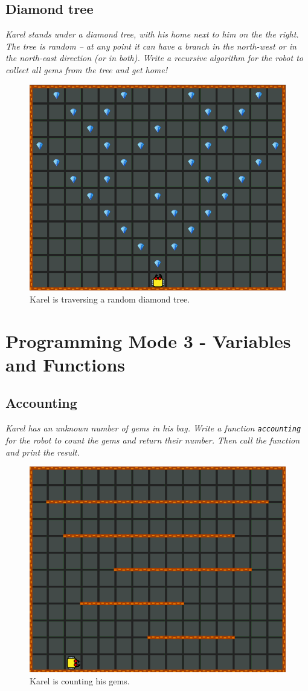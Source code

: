\subsection{Diamond tree}

{\em Karel stands under a diamond tree, with his home next to him on the the right. 
The tree is random -- at any point it can have 
a branch in the north-west or in the north-east direction (or in both). Write a recursive 
algorithm for the robot to collect all gems from the tree and get home!  }

\begin{figure}[!ht]
\begin{center}
\includegraphics[height=0.4\textwidth]{img/g04.png}
\end{center}
\vspace{-4mm}
\caption{Karel is traversing a random diamond tree.}
\label{fig:g04}
\vspace{-10mm}
\end{figure}


\section{Programming Mode 3 - Variables and Functions}

\subsection{Accounting}

{\em Karel has an unknown number of gems in his bag. Write a function {\tt accounting} for the 
robot to count the gems and return their number. Then call the function and print the result.}


\begin{figure}[!ht]
\begin{center}
\includegraphics[height=0.4\textwidth]{img/h01.png}
\end{center}
\vspace{-4mm}
\caption{Karel is counting his gems.}
\label{fig:h01}
\end{figure}

